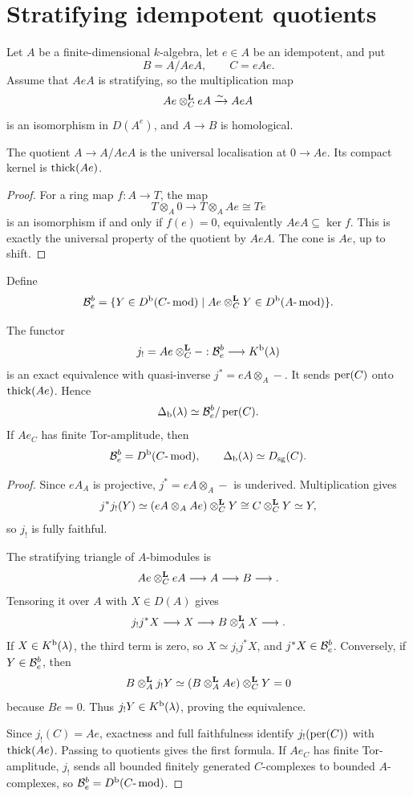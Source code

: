 
\section{Stratifying idempotent quotients}\label{sec:stratifying}

Let \(A\) be a finite-dimensional \(k\)-algebra, let \(e\in A\) be an idempotent, and put
\[
 B=A/AeA,
 \qquad
 C=eAe.
\]
Assume that \(AeA\) is stratifying, so the multiplication map
\[
 Ae\otimes^{\mathbf L}_CeA\xrightarrow{\sim}AeA
\]
is an isomorphism in \(D(A^e)\), and \(A\to B\) is homological.

\begin{lemma}\label{lem:idempotent-universal}
The quotient \(A\to A/AeA\) is the universal localisation at
\(0\to Ae\).  Its compact kernel is \(\operatorname{thick}(Ae)\).
\end{lemma}

\begin{proof}
For a ring map \(f:A\to T\), the map
\[
 T\otimes_A0\longrightarrow T\otimes_AAe\cong Te
\]
is an isomorphism if and only if \(f(e)=0\), equivalently
\(AeA\subseteq\ker f\).  This is exactly the universal property of the quotient by \(AeA\).  The cone is \(Ae\), up to shift.
\end{proof}

Define
\[
 \mathcal B_e^b=
 \{Y\in D^{\mathrm b}(C\text{-}\operatorname{mod})
   \mid Ae\otimes^{\mathbf L}_CY\in D^{\mathrm b}(A\text{-}\operatorname{mod})\}.
\]

\begin{theorem}\label{thm:stratifying-delta}
The functor
\[
 j_!=Ae\otimes^{\mathbf L}_C-:\mathcal B_e^b\longrightarrow K^{\mathrm b}(\lambda)
\]
is an exact equivalence with quasi-inverse
\(j^*=eA\otimes_A-\).  It sends \(\operatorname{per}(C)\) onto \(\operatorname{thick}(Ae)\).  Hence
\[
 \Delta_{\mathrm b}(\lambda)\simeq\mathcal B_e^b/\operatorname{per}(C).
\]
If \(Ae_C\) has finite Tor-amplitude, then
\[
 \mathcal B_e^b=D^{\mathrm b}(C\text{-}\operatorname{mod}),
 \qquad
 \Delta_{\mathrm b}(\lambda)\simeq D_{\mathrm{sg}}(C).
\]
\end{theorem}

\begin{proof}
Since \(eA_A\) is projective, \(j^*=eA\otimes_A-\) is underived.  Multiplication gives
\[
 j^*j_!(Y)
 \simeq
 (eA\otimes_AAe)\otimes^{\mathbf L}_CY
 \cong C\otimes^{\mathbf L}_CY\simeq Y,
\]
so \(j_!\) is fully faithful.

The stratifying triangle of \(A\)-bimodules is
\[
 Ae\otimes^{\mathbf L}_CeA\longrightarrow A\longrightarrow B\longrightarrow.
\]
Tensoring it over \(A\) with \(X\in D(A)\) gives
\[
 j_!j^*X\longrightarrow X\longrightarrow B\otimes^{\mathbf L}_AX\longrightarrow.
\]
If \(X\in K^{\mathrm b}(\lambda)\), the third term is zero, so
\(X\simeq j_!j^*X\), and \(j^*X\in\mathcal B_e^b\).  Conversely, if
\(Y\in\mathcal B_e^b\), then
\[
 B\otimes^{\mathbf L}_Aj_!Y
 \simeq
 (B\otimes^{\mathbf L}_AAe)\otimes^{\mathbf L}_CY=0
\]
because \(Be=0\).  Thus \(j_!Y\in K^{\mathrm b}(\lambda)\), proving the equivalence.

Since \(j_!(C)=Ae\), exactness and full faithfulness identify
\(j_!(\operatorname{per}(C))\) with \(\operatorname{thick}(Ae)\).  Passing to quotients gives the first formula.  If \(Ae_C\) has finite Tor-amplitude, \(j_!\) sends all bounded finitely generated \(C\)-complexes to bounded \(A\)-complexes, so \(\mathcal B_e^b=D^{\mathrm b}(C\text{-}\operatorname{mod})\).
\end{proof}

